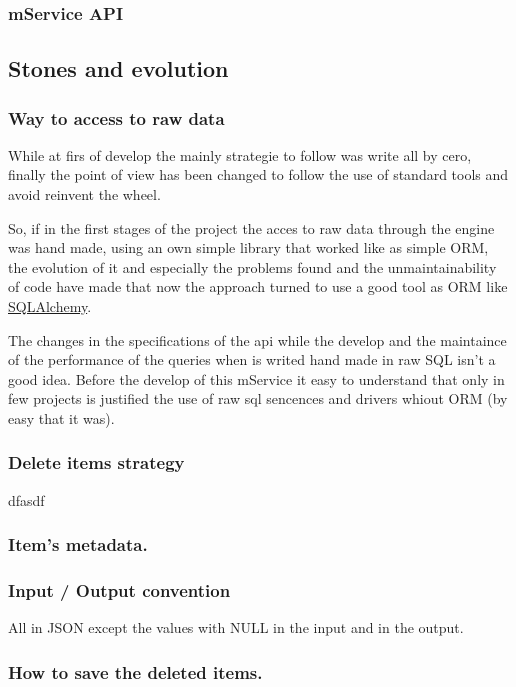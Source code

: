 \documentclass[oneside,english,titlepage]{scrbook}
\begin{document}
\subsubsection{mService API}

\subsection{Stones and evolution}

\subsubsection{Way to access to raw data}

While at firs of develop the mainly strategie to follow was write
all by cero, finally the point of view has been changed to follow
the use of standard tools and avoid reinvent the wheel.

So, if in the first stages of the project the acces to raw data through
the engine was hand made, using an own simple library that worked
like as simple ORM, the evolution of it and especially the problems
found and the unmaintainability of code have made that now the approach
turned to use a good tool as ORM like \href{http://www.google.es}{SQLAlchemy}.

The changes in the specifications of the api while the develop and
the maintaince of the performance of the queries when is writed hand
made in raw SQL isn't a good idea. Before the develop of this mService
it easy to understand that only in few projects is justified the use
of raw sql sencences and drivers whiout ORM (by easy that it was).

\subsubsection{Delete items strategy}

dfasdf

\subsubsection{Item's metadata.}

\subsubsection{Input / Output convention}

All in JSON except the values with NULL in the input and in the output.

\subsubsection{How to save the deleted items.}
\end{document}
